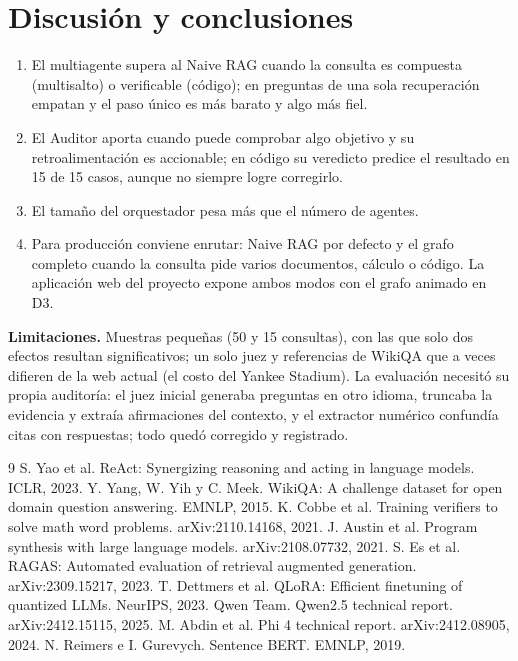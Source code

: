 \documentclass[10pt,a4paper,twocolumn]{article}
\begin{document}
\section{Discusión y conclusiones}
\begin{enumerate}
\item El multiagente supera al Naive RAG cuando la consulta es compuesta (multisalto) o verificable (código); en preguntas de una sola recuperación empatan y el paso único es más barato y algo más fiel.
\item El Auditor aporta cuando puede comprobar algo objetivo y su retroalimentación es accionable; en código su veredicto predice el resultado en 15 de 15 casos, aunque no siempre logre corregirlo.
\item El tamaño del orquestador pesa más que el número de agentes.
\item Para producción conviene enrutar: Naive RAG por defecto y el grafo completo cuando la consulta pide varios documentos, cálculo o código. La aplicación web del proyecto expone ambos modos con el grafo animado en D3.
\end{enumerate}
\textbf{Limitaciones.} Muestras pequeñas (50 y 15 consultas), con las que solo dos efectos resultan significativos; un solo juez y referencias de WikiQA que a veces difieren de la web actual (el costo del Yankee Stadium). La evaluación necesitó su propia auditoría: el juez inicial generaba preguntas en otro idioma, truncaba la evidencia y extraía afirmaciones del contexto, y el extractor numérico confundía citas con respuestas; todo quedó corregido y registrado.


\small
\begin{thebibliography}{9}
\setlength{\itemsep}{0pt}
 S. Yao et al. ReAct: Synergizing reasoning and acting in language models. ICLR, 2023.
 Y. Yang, W. Yih y C. Meek. WikiQA: A challenge dataset for open domain question answering. EMNLP, 2015.
 K. Cobbe et al. Training verifiers to solve math word problems. arXiv:2110.14168, 2021.
 J. Austin et al. Program synthesis with large language models. arXiv:2108.07732, 2021.
 S. Es et al. RAGAS: Automated evaluation of retrieval augmented generation. arXiv:2309.15217, 2023.
 T. Dettmers et al. QLoRA: Efficient finetuning of quantized LLMs. NeurIPS, 2023.
 Qwen Team. Qwen2.5 technical report. arXiv:2412.15115, 2025.
 M. Abdin et al. Phi 4 technical report. arXiv:2412.08905, 2024.
 N. Reimers e I. Gurevych. Sentence BERT. EMNLP, 2019.
\end{thebibliography}
\end{document}
